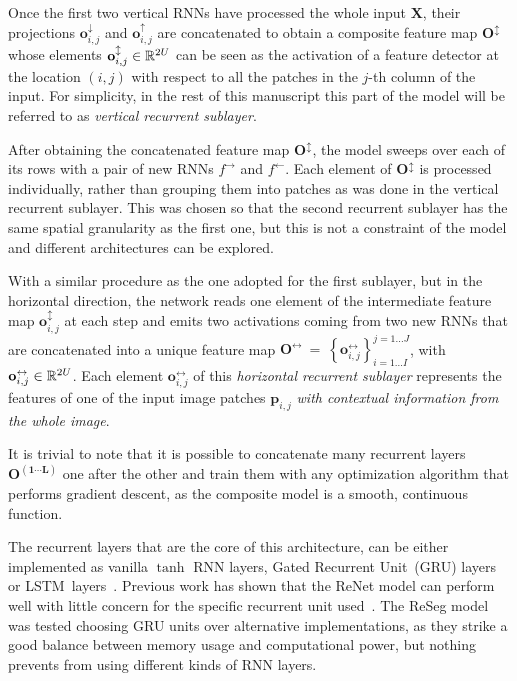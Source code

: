 Once the first two vertical RNNs have processed the whole input $\mathbf{X}$,
their projections $\mathbf{o}^{\downarrow}_{i,j}$ and
$\mathbf{o}^{\uparrow}_{i,j}$ are concatenated to obtain a composite feature
map $\mathbf{O^{\updownarrow}}$ whose elements $\mathbf{o}^{\updownarrow}_{i,j}
\in \mathbb{R}^{2U}$ can be seen as the activation of a feature detector at the
location $(i,j)$ with respect to all the patches in the $j$-th column of the
input. For simplicity, in the rest of this manuscript this part of the model
will be referred to as \emph{vertical recurrent sublayer}.

After obtaining the concatenated feature map $\mathbf{O^{\updownarrow}}$, the
model sweeps over each of its rows with a pair of new RNNs $f^{\rightarrow}$
and $f^{\leftarrow}$. Each element of $\mathbf{O^{\updownarrow}}$ is processed
individually, rather than grouping them into patches as was done in the
vertical recurrent sublayer. This was chosen so that the second recurrent
sublayer has the same spatial granularity as the first one, but this is not a
constraint of the model and different architectures can be explored.

With a similar procedure as the one adopted for the first sublayer, but in the
horizontal direction, the network reads one element of the intermediate feature
map $\mathbf{o}^\updownarrow_{i,j}$ at each step and emits two activations
coming from two new RNNs that are concatenated into a unique feature map
$\mathbf{O^\leftrightarrow}~=~\left\{ \mathbf{o}^\leftrightarrow_{i,j} \right\}
_{i=1\dots I}^{j=1\dots J}$, with $\mathbf{o}^\leftrightarrow_{i,j} \in
\mathbb{R}^{2U}$. Each element $\mathbf{o}^\leftrightarrow_{i,j}$ of this
\emph{horizontal recurrent sublayer} represents the features of one of the
input image patches $\mathbf{p}_{i,j}$ \emph{with contextual information from
the whole image}.

It is trivial to note that it is possible to concatenate many recurrent layers
$\mathbf{O^{(1 \cdots L)}}$ one after the other and train them with any
optimization algorithm that performs gradient descent, as the composite model
is a smooth, continuous function.

The recurrent layers that are the core of this architecture, can be either
implemented as vanilla $\tanh$ RNN layers, Gated Recurrent Unit~(GRU)
layers~\citep{Cho2014} or LSTM~layers~\citep{Hochreiter+Schmidhuber-1997}.
Previous work has shown that the ReNet model can perform well with little
concern for the specific recurrent unit used~\citep{visin2015renet}. The ReSeg
model was tested choosing GRU units over alternative implementations, as
they strike a good balance between memory usage and computational power, but
nothing prevents from using different kinds of RNN layers.


